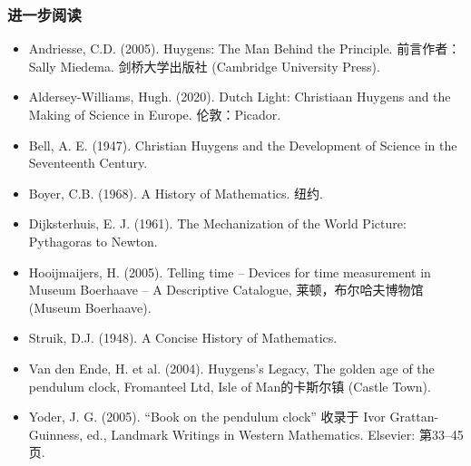 \subsubsection{进一步阅读}
\begin{itemize}
\item Andriesse, C.D. (2005). Huygens: The Man Behind the Principle. 前言作者：Sally Miedema. 剑桥大学出版社 (Cambridge University Press).
\item Aldersey-Williams, Hugh. (2020). Dutch Light: Christiaan Huygens and the Making of Science in Europe. 伦敦：Picador.
\item Bell, A. E. (1947). Christian Huygens and the Development of Science in the Seventeenth Century.
\item Boyer, C.B. (1968). A History of Mathematics. 纽约.
\item Dijksterhuis, E. J. (1961). The Mechanization of the World Picture: Pythagoras to Newton.
\item Hooijmaijers, H. (2005). Telling time – Devices for time measurement in Museum Boerhaave – A Descriptive Catalogue, 莱顿，布尔哈夫博物馆 (Museum Boerhaave).
\item Struik, D.J. (1948). A Concise History of Mathematics.
\item Van den Ende, H. et al. (2004). Huygens's Legacy, The golden age of the pendulum clock, Fromanteel Ltd, Isle of Man的卡斯尔镇 (Castle Town).
\item Yoder, J. G. (2005). “Book on the pendulum clock” 收录于 Ivor Grattan-Guinness, ed., Landmark Writings in Western Mathematics. Elsevier: 第33–45页.
\end{itemize}